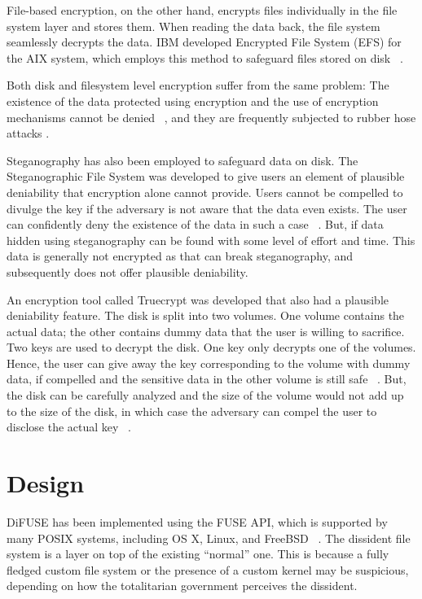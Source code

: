 \documentclass[10pt,twocolumn]{article}
\begin{document}
File-based encryption, on the other hand, encrypts files individually in the file system layer and stores them. When reading the data back, the file system seamlessly decrypts the data. IBM developed Encrypted File System (EFS) for the AIX system, which employs this method to safeguard files stored on disk ~\cite{ibmefs}. 

Both disk and filesystem level encryption suffer from the same problem: The existence of the data protected using encryption and the use of encryption mechanisms cannot be denied ~\cite{gametheory}, and they are frequently subjected to rubber hose attacks \cite{rubberhose}. 

Steganography has also been employed to safeguard data on disk. The Steganographic File System was developed to give users an element of plausible deniability that encryption alone cannot provide. Users cannot be compelled to divulge the key if the adversary is not aware that the data even exists. The user can confidently deny the existence of the data in such a case ~\cite{stegfs}. But, if data hidden using steganography can be found with some level of effort and time. This data is generally not encrypted as that can break steganography, and subsequently does not offer plausible deniability. 

An encryption tool called Truecrypt was developed that also had a plausible deniability feature. The disk is split into two volumes. One volume contains the actual data; the other contains dummy data that the user is willing to sacrifice. Two keys are used to decrypt the disk. One key only decrypts one of the volumes. Hence, the user can give away the key corresponding to the volume with dummy data, if compelled and the sensitive data in the other volume is still safe ~\cite{gametheory}. But, the disk can be carefully analyzed and the size of the volume would not add up to the size of the disk, in which case the adversary can compel the user to disclose the actual key ~\cite{truecrypt}. 

\section{Design}

DiFUSE has been implemented using the FUSE API, which is supported by many POSIX systems, including OS X, Linux, and FreeBSD ~\cite{fuse}. The dissident file system is a layer on top of the existing ``normal'' one. This is because a fully fledged custom file system or the presence of a custom kernel may be suspicious, depending on how the totalitarian government perceives the dissident. 
\end{document}
